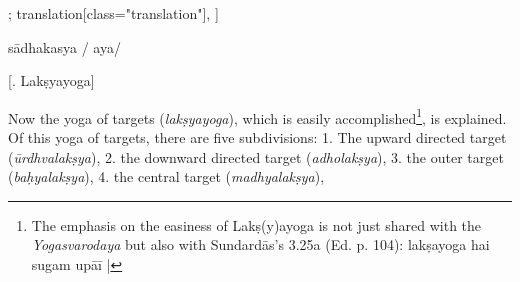 \begin{alignment}[
  texts=edition[class="edition"];
  translation[class="translation"],
  ]
\begin{edition}
\begin{prose}
sādhakasya
/
aya/
    \end{prose}
  \end{edition}
  \begin{translation}
    \centerline{\textrm{\small{[.\textsuperscript{} Lakṣyayoga]}}}
    \label{laksyayogatrans}
    \bigskip
    \begin{tlate}
      \noindent
   Now the yoga of targets (\textit{lakṣyayoga}), which is easily accomplished\footnote{The emphasis on the easiness of Lakṣ(y)ayoga is not just shared with the \textit{Yogasvarodaya} but also with Sundardās's  3.25a (Ed. p. 104): lakṣayoga hai sugam upāī |}, is explained. Of this yoga of targets, there are five subdivisions:
   1. The upward directed target (\textit{ūrdhvalakṣya}),
   2. the downward directed target (\textit{adholakṣya}),
   3. the outer target (\textit{baḥyalakṣya}),
   4. the central target (\textit{madhyalakṣya}),

\end{tlate}
\end{translation}
\end{alignment}
